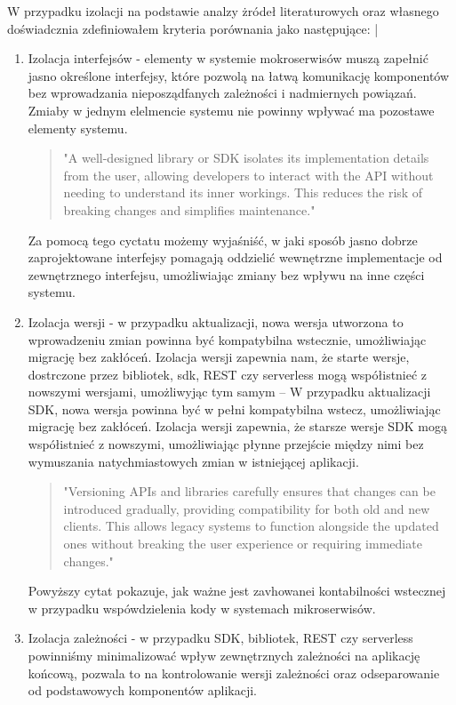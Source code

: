 \documentclass[runningheads,12pt]{llncs}
\begin{document}
W przypadku izolacji na podstawie analzy żródeł literaturowych oraz własnego doświadcznia zdefiniowałem kryteria porównania jako następujące:
|
\begin{enumerate}
    \item Izolacja interfejsów - elementy w systemie mokroserwisów muszą zapełnić jasno określone interfejsy, które pozwolą na łatwą komunikację komponentów bez wprowadzania nieposządfanych zależności i nadmiernych powiązań. Zmiaby w jednym elelmencie systemu nie powinny wpływać ma pozostawe elementy systemu.
    \begin{quote}
        "A well-designed library or SDK isolates its implementation details from the user, allowing developers to interact with the API without needing to understand its inner workings. This reduces the risk of breaking changes and simplifies maintenance." ~\cite[p. 75]{bloch2018effective}
    \end{quote}
    Za pomocą tego cyctatu możemy wyjaśniść, w jaki sposób jasno dobrze zaprojektowane interfejsy pomagają oddzielić wewnętrzne implementacje od zewnętrznego interfejsu, umożliwiając zmiany bez wpływu na inne części systemu.
    \item Izolacja wersji - w przypadku aktualizacji, nowa wersja utworzona to wprowadzeniu zmian powinna być kompatybilna wstecznie, umożliwiając migrację bez zakłóceń. Izolacja wersji zapewnia nam, że starte wersje, dostrczone przez bibliotek, sdk, REST  czy serverless mogą współistnieć z nowszymi wersjami, umożliwyjąc tym samym – W przypadku aktualizacji SDK, nowa wersja powinna być w pełni kompatybilna wstecz, umożliwiając migrację bez zakłóceń. Izolacja wersji zapewnia, że starsze wersje SDK mogą współistnieć z nowszymi, umożliwiając płynne przejście między nimi bez wymuszania natychmiastowych zmian w istniejącej aplikacji.
    \begin{quote}
        "Versioning APIs and libraries carefully ensures that changes can be introduced gradually, providing compatibility for both old and new clients. This allows legacy systems to function alongside the updated ones without breaking the user experience or requiring immediate changes." ~\cite[p. 172]{fowler2012patterns}
    \end{quote}
    Powyższy cytat pokazuje, jak ważne jest zavhowanei kontabilności wstecznej w przypadku wspówdzielenia kody w systemach mikroserwisów.
    \item Izolacja zależności - w przypadku SDK, bibliotek, REST czy serverless powinniśmy minimalizować wpływ zewnętrznych zależności na aplikację końcową, pozwala to na kontrolowanie wersji zależności oraz odseparowanie od podstawowych komponentów aplikacji.

\end{enumerate}
\end{document}

